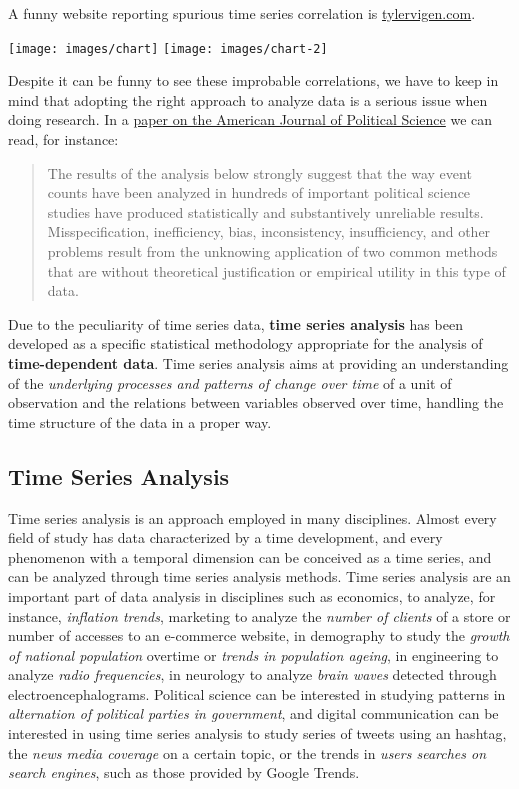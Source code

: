 \documentclass[
]{article}
\begin{document}
A funny website reporting spurious time series correlation is \href{https://www.tylervigen.com/spurious-correlations}{tylervigen.com}.

\texttt{[image: images/chart]}
\texttt{[image: images/chart-2]}

Despite it can be funny to see these improbable correlations, we have to keep in mind that adopting the right approach to analyze data is a serious issue when doing research. In a \href{https://gking.harvard.edu/files/gking/files/epr.pdf}{paper on the American Journal of Political Science} we can read, for instance:

\begin{quote}
The results of the analysis below strongly suggest that the way event counts have been analyzed in hundreds of important political science studies have produced statistically and substantively unreliable results. Misspecification, inefficiency, bias, inconsistency, insufficiency, and other problems result from the unknowing application of two common methods that are without theoretical justification or empirical utility in this type of data.
\end{quote}

Due to the peculiarity of time series data, \textbf{time series analysis} has been developed as a specific statistical methodology appropriate for the analysis of \textbf{time-dependent data}. Time series analysis aims at providing an understanding of the \emph{underlying processes and patterns of change over time} of a unit of observation and the relations between variables observed over time, handling the time structure of the data in a proper way.

\subsection{Time Series Analysis}\label{time-series-analysis}

Time series analysis is an approach employed in many disciplines. Almost every field of study has data characterized by a time development, and every phenomenon with a temporal dimension can be conceived as a time series, and can be analyzed through time series analysis methods. Time series analysis are an important part of data analysis in disciplines such as economics, to analyze, for instance, \emph{inflation trends}, marketing to analyze the \emph{number of clients} of a store or number of accesses to an e-commerce website, in demography to study the \emph{growth of national population} overtime or \emph{trends in population ageing}, in engineering to analyze \emph{radio frequencies}, in neurology to analyze \emph{brain waves} detected through electroencephalograms. Political science can be interested in studying patterns in \emph{alternation of political parties in government}, and digital communication can be interested in using time series analysis to study series of tweets using an hashtag, the \emph{news media coverage} on a certain topic, or the trends in \emph{users searches on search engines}, such as those provided by Google Trends.
\end{document}

